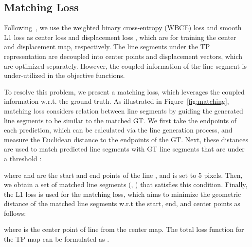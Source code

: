 \documentclass[letterpaper]{article} \usepackage{aaai22}  \usepackage{times}  \usepackage{helvet}  \usepackage{courier}  \usepackage[hyphens]{url}  \usepackage{graphicx} \urlstyle{rm} \def\UrlFont{\rm}  \usepackage{natbib}  \usepackage{caption} \DeclareCaptionStyle{ruled}{labelfont=normalfont,labelsep=colon,strut=off} \frenchspacing  \setlength{\pdfpagewidth}{8.5in}  \setlength{\pdfpageheight}{11in}  \usepackage{algorithm}
\begin{document}
\subsection{Matching Loss}
Following~\cite{huang2020tp}, we use the weighted binary cross-entropy (WBCE) loss and smooth L1 loss as center loss  and displacement loss , which are for training the center and displacement map, respectively.
The line segments under the TP representation are decoupled into center points and displacement vectors, which are optimized separately.
However, the coupled information of the line segment is under-utilized in the objective functions.

To resolve this problem, we present a matching loss, which leverages the coupled information w.r.t. the ground truth.
As illustrated in Figure~\ref{fig:matching}, matching loss considers relation between line segments by guiding the generated line segments to be similar to the matched GT.
We first take the endpoints of each prediction, which can be calculated via the line generation process, and measure the Euclidean distance  to the endpoints of the GT.
Next, these distances are used to match predicted line segments  with GT line segments  that are under a threshold :

where  and  are the start and end points of the line , and  is set to 5 pixels.
Then, we obtain a set  of matched line segments (, ) that satisfies this condition.
Finally, the L1 loss is used for the matching loss, which aims to minimize the geometric distance of the matched line segments w.r.t the start, end, and center points as follows:

where  is the center point of line  from the center map.
The total loss function for the TP map can be formulated as .

\begin{comment}
For a loss function to train the center map, the weighted binary cross-entropy (WBCE) loss is used in \cite{huang2020tp}.
However, we observe that the number of positive (foreground) pixels is much less than that of negative (background) pixels, and such foreground-background class imbalance degrades the performance of the WBCE loss.
This is because the majority of pixels are easy negatives that contribute no useful learning signals.
Thus, we separate positive and negative terms of the binary cross-entropy loss to have the same scale, and reformulate a separated binary classification loss as follows:

where  outputs 1 if the pixel  of the GT map is non-zero, otherwise 0,  denotes a sigmoid function, and  and  are pixel values of the GT and feature map, respectively.
We use the center loss as , where  denotes center map and set the weights (, ) as (1,30).
For the displacement loss , we use smooth L1 loss for regression learning as~\cite{huang2020tp}.
\end{comment}
\begin{comment}

where  is a pixel value in the displacement map.
\end{comment}
\end{document}
